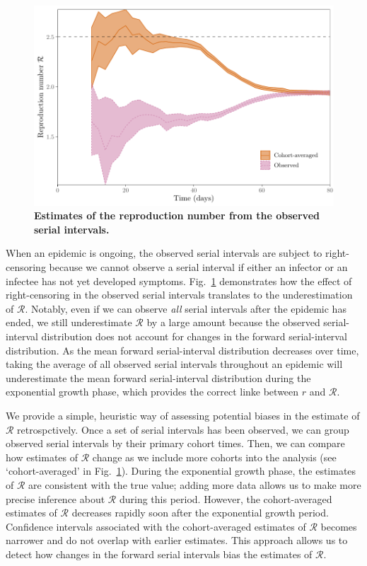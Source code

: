 \documentclass[12pt]{article}
\newcommand{\fref}[1]{Fig.~\ref{fig:#1}}
\begin{document}
\begin{figure}[!ht]
\includegraphics[width=\textwidth]{observedrR.pdf}
\caption{
\textbf{Estimates of the reproduction number from the observed serial intervals.}
}
\label{fig:obsrR}
\end{figure}

When an epidemic is ongoing, the observed serial intervals are subject to right-censoring because we cannot observe a serial interval if either an infector or an infectee has not yet developed symptoms.
\fref{obsrR} demonstrates how the effect of right-censoring in the observed serial intervals translates to the underestimation of $\mathcal R$.
Notably, even if we can observe \emph{all} serial intervals after the epidemic has ended, we still underestimate $\mathcal R$ by a large amount because the observed serial-interval distribution does not account for changes in the forward serial-interval distribution.
As the mean forward serial-interval distribution decreases over time, taking the average of all observed serial intervals throughout an epidemic will underestimate the mean forward serial-interval distribution during the exponential growth phase, which provides the correct linke between $r$ and $\mathcal R$.

We provide a simple, heuristic way of assessing potential biases in the estimate of $\mathcal R$ retrospctively.
Once a set of serial intervals has been observed, we can group observed serial intervals by their primary cohort times.
Then, we can compare how estimates of $\mathcal R$ change as we include more cohorts into the analysis (see `cohort-averaged' in \fref{obsrR}).
During the exponential growth phase, the estimates of $\mathcal R$ are consistent with the true value;
adding more data allows us to make more precise inference about $\mathcal R$ during this period.
However, the cohort-averaged estimates of $\mathcal R$ decreases rapidly soon after the exponential growth period.
Confidence intervals associated with the cohort-averaged estimates of $\mathcal R$ becomes narrower and do not overlap with earlier estimates.
This approach allows us to detect how changes in the forward serial intervals bias the estimates of $\mathcal R$.
\end{document}
